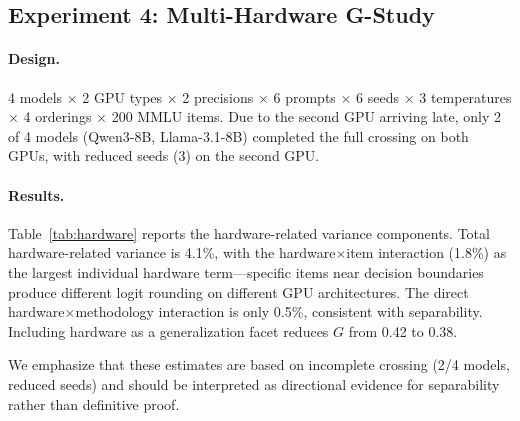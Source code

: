 \documentclass[11pt]{article}
\newcommand{\gcoeff}{G}
\begin{document}
\subsection{Experiment 4: Multi-Hardware G-Study}
\label{sec:exp4}

\paragraph{Design.}
4 models $\times$ 2 GPU types $\times$ 2 precisions $\times$ 6 prompts $\times$ 6 seeds $\times$ 3 temperatures $\times$ 4 orderings $\times$ 200 MMLU items.
Due to the second GPU arriving late, only 2 of 4 models (Qwen3-8B, Llama-3.1-8B) completed the full crossing on both GPUs, with reduced seeds (3) on the second GPU.

\paragraph{Results.}
Table~\ref{tab:hardware} reports the hardware-related variance components.
Total hardware-related variance is 4.1\%, with the hardware$\times$item interaction (1.8\%) as the largest individual hardware term---specific items near decision boundaries produce different logit rounding on different GPU architectures.
The direct hardware$\times$methodology interaction is only 0.5\%, consistent with separability.
Including hardware as a generalization facet reduces $\gcoeff$ from 0.42 to 0.38.

We emphasize that these estimates are based on incomplete crossing (2/4 models, reduced seeds) and should be interpreted as directional evidence for separability rather than definitive proof.
\end{document}
